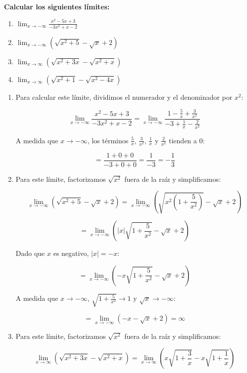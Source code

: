 \documentclass[answers]{exam} %
\begin{document}
\begin{questions}
	\question \large\textbf{Calcular los siguientes límites:}
	\begin{enumerate}[label=\alph*.]
		\item $\displaystyle \lim_{x\to{-\infty}} \frac{x^2-5x+3}{-3x^2+x-2}$
		\item $\displaystyle \lim_{x\to{-\infty}} (\sqrt{x^2+5}-\sqrt{x}+2)$
		\item $\displaystyle \lim_{x\to{\infty}} (\sqrt{x^2+3x}-\sqrt{x^2+x})$
		\item $\displaystyle \lim_{x\to{\infty}} (\sqrt{x^2+1}-\sqrt{x^2-4x})$
	\end{enumerate}
	\begin{solution}
		\begin{enumerate}[label=\alph*.]
			\item Para calcular este límite, dividimos el numerador y el denominador por \(x^2\):
	
			\[
			\lim_{x\to{-\infty}} \frac{x^2-5x+3}{-3x^2+x-2} = \lim_{x\to{-\infty}} \frac{1-\frac{5}{x}+\frac{3}{x^2}}{-3+\frac{1}{x}-\frac{2}{x^2}}
			\]
	
			A medida que \(x \to -\infty\), los términos \(\frac{5}{x}\), \(\frac{3}{x^2}\), \(\frac{1}{x}\) y \(\frac{2}{x^2}\) tienden a 0:
	
			\[
			= \frac{1+0+0}{-3+0+0} = \frac{1}{-3} = -\frac{1}{3}
			\]
	
			\item Para este límite, factorizamos \(\sqrt{x^2}\) fuera de la raíz y simplificamos:
	
			\[
			\lim_{x\to{-\infty}} (\sqrt{x^2+5}-\sqrt{x}+2) = \lim_{x\to{-\infty}} (\sqrt{x^2(1+\frac{5}{x^2})}-\sqrt{x}+2)
			\]
	
			\[
			= \lim_{x\to{-\infty}} (|x|\sqrt{1+\frac{5}{x^2}}-\sqrt{x}+2)
			\]
	
			Dado que \(x\) es negativo, \(|x| = -x\):
	
			\[
			= \lim_{x\to{-\infty}} (-x\sqrt{1+\frac{5}{x^2}}-\sqrt{x}+2)
			\]
	
			A medida que \(x \to -\infty\), \(\sqrt{1+\frac{5}{x^2}} \to 1\) y \(\sqrt{x} \to -\infty\):
	
			\[
			= \lim_{x\to{-\infty}} (-x - \sqrt{x} + 2) = \infty
			\]
	
			\item Para este límite, factorizamos \(\sqrt{x^2}\) fuera de la raíz y simplificamos:
	
			\[
			\lim_{x\to{\infty}} (\sqrt{x^2+3x}-\sqrt{x^2+x}) = \lim_{x\to{\infty}} (x\sqrt{1+\frac{3}{x}}-x\sqrt{1+\frac{1}{x}})
			\]
	

\end{enumerate}
\end{solution}
\end{questions}
\end{document}
